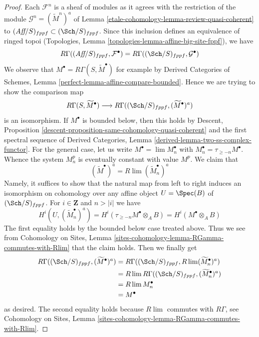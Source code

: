 \begin{proof}
Each $\mathcal{F}^n$ is a sheaf of modules as it agrees with the
restriction of the module $\mathcal{G}^n = (\widetilde{M}^n)^a$ of
Lemma \ref{etale-cohomology-lemma-review-quasi-coherent} to
$(\textit{Aff}/S)_{fppf} \subset (\Sch/S)_{fppf}$.
Since this inclusion defines an equivalence of ringed topoi
(Topologies, Lemma \ref{topologies-lemma-affine-big-site-fppf}),
we have
$$
R\Gamma((\textit{Aff}/S)_{fppf}, \mathcal{F}^\bullet) =
R\Gamma((\Sch/S)_{fppf}, \mathcal{G}^\bullet)
$$
We observe that $M^\bullet = R\Gamma(S, \widetilde{M}^\bullet)$
for example by Derived Categories of Schemes, Lemma
\ref{perfect-lemma-affine-compare-bounded}. Hence we are trying
to show the comparison map
$$
R\Gamma(S, \widetilde{M}^\bullet)
\longrightarrow
R\Gamma((\Sch/S)_{fppf}, (\widetilde{M}^\bullet)^a)
$$
is an isomorphism. If $M^\bullet$ is bounded below, then this
holds by Descent, Proposition
\ref{descent-proposition-same-cohomology-quasi-coherent}
and the first spectral sequence of Derived Categories, Lemma
\ref{derived-lemma-two-ss-complex-functor}.
For the general case, let us write $M^\bullet = \lim M_n^\bullet$
with $M_n^\bullet = \tau_{\geq -n}M^\bullet$. Whence the system
$M_n^p$ is eventually constant with value $M^p$. We claim that
$$
(\widetilde{M}^\bullet)^a = R\lim (\widetilde{M}_n^\bullet)^a
$$
Namely, it suffices to show that the natural map from left to right
induces an isomorphism on cohomology over any affine object
$U = \Spec(B)$ of $(\Sch/S)_{fppf}$. For $i \in \mathbf{Z}$ and
$n > |i|$ we have
$$
H^i(U, (\widetilde{M}_n^\bullet)^a) =
H^i(\tau_{\geq -n}M^\bullet \otimes_A B) =
H^i(M^\bullet \otimes_A B)
$$
The first equality holds by the bounded below case treated above.
Thus we see from Cohomology on Sites, Lemma
\ref{sites-cohomology-lemma-RGamma-commutes-with-Rlim}
that the claim holds. Then we finally get
\begin{align*}
R\Gamma((\Sch/S)_{fppf}, (\widetilde{M}^\bullet)^a)
& =
R\Gamma((\Sch/S)_{fppf}, R\lim (\widetilde{M}_n^\bullet)^a) \\
& =
R\lim R\Gamma((\Sch/S)_{fppf}, (\widetilde{M}_n^\bullet)^a) \\
& =
R\lim M_n^\bullet \\
& =
M^\bullet
\end{align*}
as desired. The second equality holds because $R\lim$ commutes with
$R\Gamma$, see Cohomology on Sites, Lemma
\ref{sites-cohomology-lemma-RGamma-commutes-with-Rlim}.
\end{proof}

